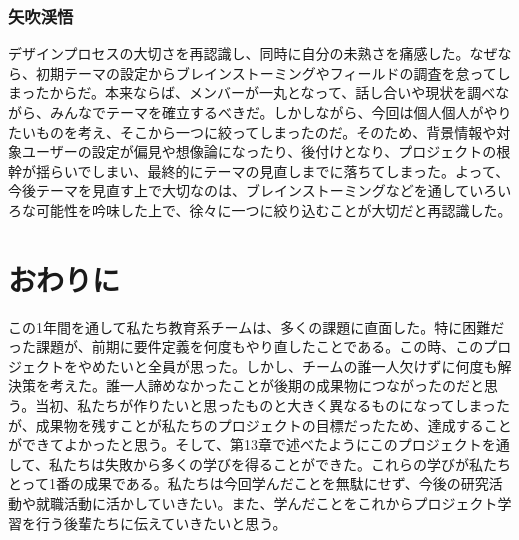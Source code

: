 \documentclass[openany,11pt,papersize]{jsbook}
\begin{document}
\subsection{矢吹渓悟}
デザインプロセスの大切さを再認識し、同時に自分の未熟さを痛感した。なぜなら、初期テーマの設定からブレインストーミングやフィールドの調査を怠ってしまったからだ。本来ならば、メンバーが一丸となって、話し合いや現状を調べながら、みんなでテーマを確立するべきだ。しかしながら、今回は個人個人がやりたいものを考え、そこから一つに絞ってしまったのだ。そのため、背景情報や対象ユーザーの設定が偏見や想像論になったり、後付けとなり、プロジェクトの根幹が揺らいでしまい、最終的にテーマの見直しまでに落ちてしまった。よって、今後テーマを見直す上で大切なのは、ブレインストーミングなどを通していろいろな可能性を吟味した上で、徐々に一つに絞り込むことが大切だと再認識した。

\chapter{おわりに}
この1年間を通して私たち教育系チームは、多くの課題に直面した。特に困難だった課題が、前期に要件定義を何度もやり直したことである。この時、このプロジェクトをやめたいと全員が思った。しかし、チームの誰一人欠けずに何度も解決策を考えた。誰一人諦めなかったことが後期の成果物につながったのだと思う。当初、私たちが作りたいと思ったものと大きく異なるものになってしまったが、成果物を残すことが私たちのプロジェクトの目標だったため、達成することができてよかったと思う。そして、第13章で述べたようにこのプロジェクトを通して、私たちは失敗から多くの学びを得ることができた。これらの学びが私たちとって1番の成果である。私たちは今回学んだことを無駄にせず、今後の研究活動や就職活動に活かしていきたい。また、学んだことをこれからプロジェクト学習を行う後輩たちに伝えていきたいと思う。
\end{document}
